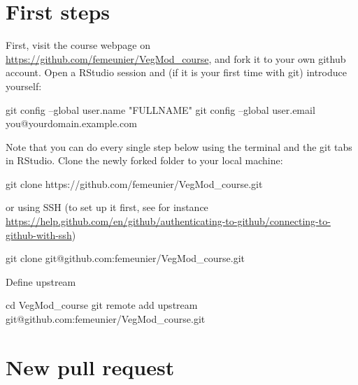 \documentclass[12pt,oneside]{book}
\newenvironment{Shaded}{\begin{snugshade}}{\end{snugshade}}
\newcommand{\StringTok}[1]{\textcolor[rgb]{0.31,0.60,0.02}{#1}}
\newcommand{\FunctionTok}[1]{\textcolor[rgb]{0.00,0.00,0.00}{#1}}
\newcommand{\BuiltInTok}[1]{#1}
\newcommand{\NormalTok}[1]{#1}
\begin{document}
\section*{First steps}\label{first-steps}

First, visit the course webpage on
\url{https://github.com/femeunier/VegMod_course}, and fork it to your
own github account. Open a RStudio session and (if it is your first time
with git) introduce yourself:

\begin{Shaded}
\begin{Highlighting}[]
\FunctionTok{git}\NormalTok{ config --global user.name }\StringTok{"FULLNAME"}
\FunctionTok{git}\NormalTok{ config --global user.email you@yourdomain.example.com}
\end{Highlighting}
\end{Shaded}

Note that you can do every single step below using the terminal and the
git tabs in RStudio. Clone the newly forked folder to your local
machine:

\begin{Shaded}
\begin{Highlighting}[]
\FunctionTok{git}\NormalTok{ clone https://github.com/femeunier/VegMod_course.git}
\end{Highlighting}
\end{Shaded}

or using SSH (to set up it first, see for instance
\url{https://help.github.com/en/github/authenticating-to-github/connecting-to-github-with-ssh})

\begin{Shaded}
\begin{Highlighting}[]
\FunctionTok{git}\NormalTok{ clone git@github.com:femeunier/VegMod_course.git}
\end{Highlighting}
\end{Shaded}

Define upstream

\begin{Shaded}
\begin{Highlighting}[]
\BuiltInTok{cd}\NormalTok{ VegMod_course}
\FunctionTok{git}\NormalTok{ remote add upstream git@github.com:femeunier/VegMod_course.git}
\end{Highlighting}
\end{Shaded}

\section*{New pull request}\label{new-pull-request}
\end{document}

